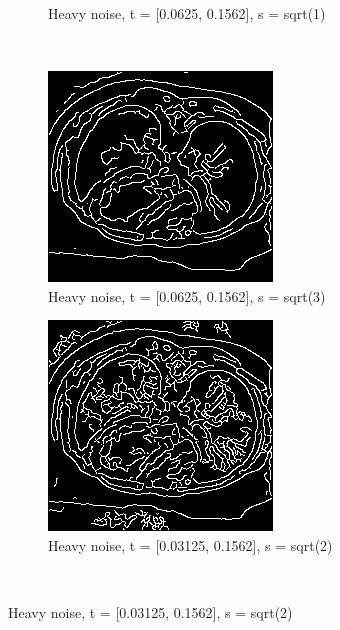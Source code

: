\begin{figure}[H]
\begin{subfigure}{.5\textwidth}
    \caption{Heavy noise, t = [0.0625, 0.1562], s = sqrt(1)}
    \label{fig:h_noise_insens_l_thres}
  \end{subfigure}\\%
    \begin{subfigure}{.5\textwidth}
    \centering
    \includegraphics[width=.9\textwidth]{./edgedetection/heavy_noise/h_noise_h_sigma_sqr3}
    \caption{Heavy noise, t = [0.0625, 0.1562], s = sqrt(3)}
    \label{fig:h_noise_h_sigma_sqr3}
  \end{subfigure}%
  \begin{subfigure}{.5\textwidth}
    \centering
    \includegraphics[width=.9\textwidth]{./edgedetection/heavy_noise/h_noise_sens_l_thres}
    \caption{Heavy noise, t = [0.03125, 0.1562], s = sqrt(2)}
    \label{fig:h_noise_sens_l_thres}
  \end{subfigure}\\%
\end{figure}

